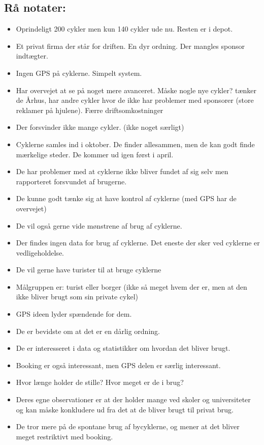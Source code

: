 \subsection{Rå notater:}

\begin{itemize}
\item Oprindeligt 200 cykler men kun 140 cykler ude nu. Resten er i depot.
\item Et privat firma der står for driften. En dyr ordning. Der mangles sponsor indtægter.
\item Ingen GPS på cyklerne. Simpelt system.
\item Har overvejet at se på noget mere avanceret. Måske nogle nye cykler? tænker de
Århus, har andre cykler hvor de ikke har problemer med sponsorer (store reklamer på hjulene). Færre driftsomkostninger
\item Der forsvinder ikke mange cykler. (ikke noget særligt)
\item Cyklerne samles ind i oktober. De finder allesammen, men de kan godt finde mærkelige steder. De kommer ud igen først i april.
\item De har problemer med at cyklerne ikke bliver fundet af sig selv men rapporteret forsvundet af brugerne.
\item De kunne godt tænke sig at have kontrol af cyklerne (med GPS har de overvejet)
\item De vil også gerne vide mønstrene af brug af cyklerne.
\item Der findes ingen data for brug af cyklerne. Det eneste der sker ved cyklerne er vedligeholdelse.
\item De vil gerne have turister til at bruge cyklerne
\item Målgruppen er: turist eller borger (ikke så meget hvem der er, men at den ikke bliver brugt som sin private cykel)
\item GPS ideen lyder spændende for dem.
\item De er bevidste om at det er en dårlig ordning.
\item De er interesseret i data og statistikker om hvordan det bliver brugt.
\item Booking er også interessant, men GPS delen er særlig interessant.
\item Hvor længe holder de stille? Hvor meget er de i brug?
\item Deres egne observationer er at der holder mange ved skoler og universiteter og kan måske konkludere ud fra det at de bliver brugt til privat brug.
\item De tror mere på de spontane brug af bycyklerne, og mener at det bliver meget restriktivt med booking.
\end{itemize}